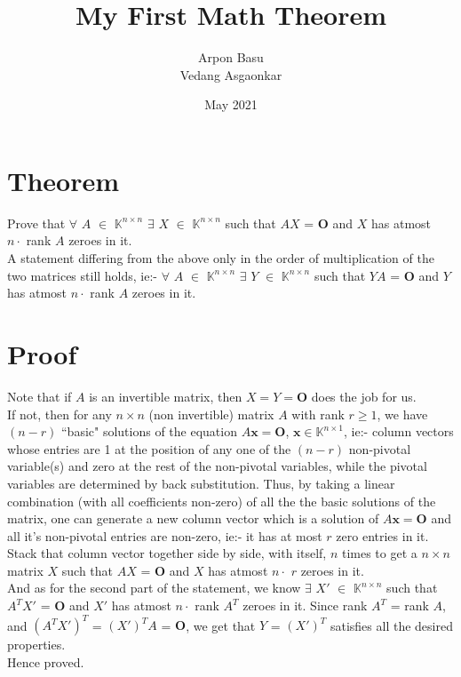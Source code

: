 \documentclass{article}
\title{My First Math Theorem}
\author{Arpon Basu\\Vedang Asgaonkar}
\date{May 2021}
\begin{document}
\maketitle

\section{Theorem}
Prove that $\forall$ $A$ $\in$ $\mathbb{K}^{n\times n}$ $\exists$ $X$ $\in$ $\mathbb{K}^{n\times n}$ such that $AX$ = $\textbf{O}$ and $X$ has atmost \\
$n\cdot$ rank $A$ zeroes in it.\\
A statement differing from the above only in the order of multiplication of the two matrices still holds, ie:- $\forall$ $A$ $\in$ $\mathbb{K}^{n\times n}$ $\exists$ $Y$ $\in$ $\mathbb{K}^{n\times n}$ such that $YA$ = $\textbf{O}$ and $Y$ has atmost $n\cdot$ rank $A$ zeroes in it. 

\section{Proof}
Note that if $A$ is an invertible matrix, then $X = Y = \textbf{O}$ does the job for us.\\
If not, then for any $n\times n$ (non invertible) matrix $A$ with rank $r \geq 1$, we have $(n - r)$ ``basic" solutions of the equation $A\textbf{x} = \textbf{O}$, $\textbf{x} \in \mathbb{K}^{n\times 1}$, ie:- column vectors whose entries are 1 at the position of any one of the $(n - r)$ non-pivotal variable(s) and zero at the rest of the non-pivotal variables, while the pivotal variables are determined by back substitution. Thus, by taking a linear combination (with all coefficients non-zero) of all the the basic solutions of the matrix, one can generate a new column vector which is a solution of $A\textbf{x} = \textbf{O}$ and all it's non-pivotal entries are non-zero, ie:- it has at most $r$ zero entries in it. Stack that column vector together side by side, with itself, $n$ times to get a $n\times n$ matrix $X$ such that $AX$ = $\textbf{O}$ and $X$ has atmost $n\cdot$ $r$ zeroes in it.\\
And as for the second part of the statement, we know $\exists$ $X'$ $\in$ $\mathbb{K}^{n\times n}$ such that $A^{T}X'$ = $\textbf{O}$ and $X'$ has atmost $n\cdot$ rank $A^{T}$ zeroes in it. Since rank $A^{T}$ = rank $A$, and $(A^{T}X')^{T}$ = $(X')^{T}A$ = $\textbf{O}$, we get that $Y$ = $(X')^{T}$ satisfies all the desired properties.\\
Hence proved.





















\end{document}
